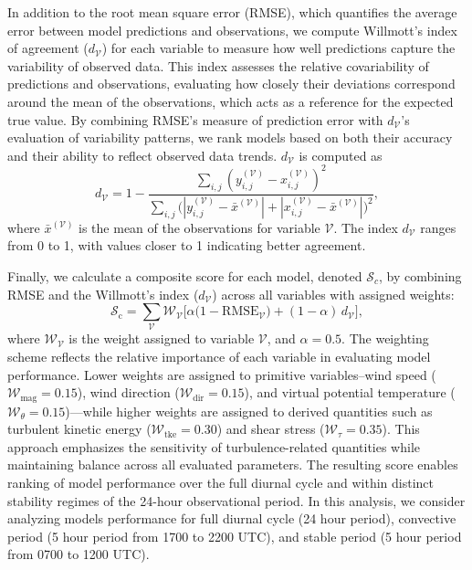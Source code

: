 In addition to the root mean square error (RMSE), which quantifies the average error between model predictions and observations, we compute Willmott’s index of agreement ($d_\mathcal{V}$) \citep{willmott1981validation} for each variable to measure how well predictions capture the variability of observed data. This index assesses the relative covariability of predictions and observations, evaluating how closely their deviations correspond around the mean of the observations, which acts as a reference for the expected true value. By combining RMSE’s measure of prediction error with $d_\mathcal{V}$’s evaluation of variability patterns, we rank models based on both their accuracy and their ability to reflect observed data trends. $d_\mathcal{V}$ is computed as
\begin{equation}
    d_\mathcal{V} = 1 - \frac{\sum_{i,j} (y_{i,j}^{(\mathcal{V})} - x_{i,j}^{(\mathcal{V})})^2}{\sum_{i,j} \big(|y_{i,j}^{(\mathcal{V})} - \bar{x}^{(\mathcal{V})}| + |x_{i,j}^{(\mathcal{V})} - \bar{x}^{(\mathcal{V})}|\big)^2},
    \label{eq:willmott}
\end{equation}
where $\bar{x}^{(\mathcal{V})}$ is the mean of the observations for variable $\mathcal{V}$. The index $d_\mathcal{V}$ ranges from 0 to 1, with values closer to 1 indicating better agreement.

Finally, we calculate a composite score for each model, denoted $\mathcal{S}_c$, by combining RMSE and the Willmott’s index ($d_\mathcal{V}$) across all variables with assigned weights:
\begin{equation}
\mathcal{S}_\mathrm{c} = \sum_\mathcal{V} \mathcal{W}_\mathcal{V} \Big[ \alpha \big(1 - \text{RMSE}_\mathcal{V}\big) + (1 - \alpha) \, d_\mathcal{V} \Big],
\label{eq:compositescore}
\end{equation}
where $\mathcal{W}_\mathcal{V}$ is the weight assigned to variable $\mathcal{V}$, and $\alpha = 0.5$. The weighting scheme reflects the relative importance of each variable in evaluating model performance. Lower weights are assigned to primitive variables--wind speed ($\mathcal{W}_{\mathrm{mag}} = 0.15$), wind direction ($\mathcal{W}_{\mathrm{dir}} = 0.15$), and virtual potential temperature ($\mathcal{W}_{\theta} = 0.15$)---while higher weights are assigned to derived quantities such as turbulent kinetic energy ($\mathcal{W}_{\mathrm{tke}} = 0.30$) and shear stress ($\mathcal{W}_{\tau} = 0.35$). This approach emphasizes the sensitivity of turbulence-related quantities while maintaining balance across all evaluated parameters. The resulting score enables ranking of model performance over the full diurnal cycle and within distinct stability regimes of the 24-hour observational period. In this analysis, we consider analyzing models performance for full diurnal cycle (24 hour period), convective period (5 hour period from 1700 to 2200 UTC), and stable period (5 hour period from 0700 to 1200 UTC).

